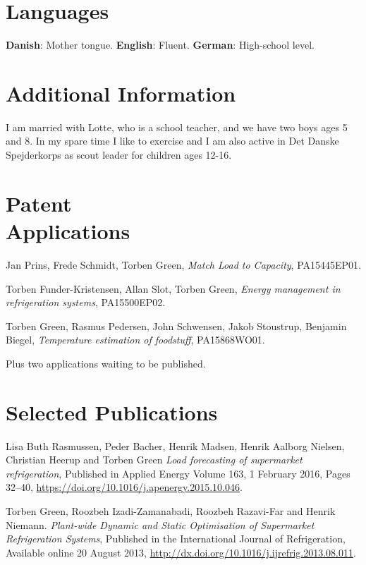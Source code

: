 \documentclass[margin,line,a4paper]{resume}
\begin{document}
\begin{resume}
\section{\mysidestyle Languages}

\textbf{Danish}: Mother tongue. \textbf{English}: Fluent. \textbf{German}: High-school level.

 \section{\mysidestyle Additional Information}

 I am married with Lotte, who is a school teacher, and we have two boys ages 5 and 8. In my spare time I like to exercise and I am also active in Det Danske Spejderkorps as scout leader for children ages 12-16.


\section{\mysidestyle Patent \\Applications}

Jan Prins, Frede Schmidt, Torben Green, \textit{Match Load to Capacity}, PA15445EP01.

Torben Funder-Kristensen, Allan Slot, Torben Green, \textit{Energy management in refrigeration systems}, PA15500EP02.

Torben Green, Rasmus Pedersen, John Schwensen, Jakob Stoustrup, Benjamin Biegel, \textit{Temperature estimation of foodstuff}, PA15868WO01.

Plus two applications waiting to be published.

\section{\mysidestyle Selected Publications}

Lisa Buth Rasmussen, Peder Bacher, Henrik Madsen, Henrik Aalborg Nielsen, Christian Heerup and Torben Green \textit{Load forecasting of supermarket refrigeration}, Published in Applied Energy Volume 163, 1 February 2016, Pages 32–40, \href{https://doi.org/10.1016/j.apenergy.2015.10.046}{https://doi.org/10.1016/j.apenergy.2015.10.046}.

Torben Green, Roozbeh Izadi-Zamanabadi, Roozbeh Razavi-Far and Henrik Niemann. \textit{Plant-wide Dynamic and Static Optimisation of Supermarket Refrigeration Systems}, Published in the International Journal of Refrigeration, Available online 20 August 2013, \href{http://dx.doi.org/10.1016/j.ijrefrig.2013.08.011}{http://dx.doi.org/10.1016/j.ijrefrig.2013.08.011}.


\end{resume}
\end{document}
